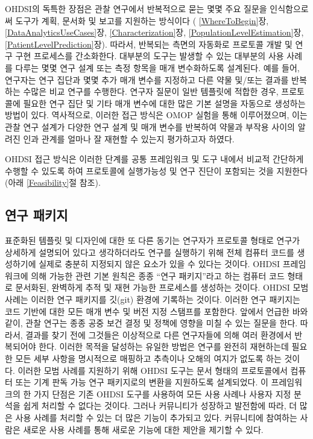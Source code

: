 \documentclass[11pt]{book}
\theoremstyle{definition}
\theoremstyle{definition}
\theoremstyle{definition}
\theoremstyle{remark}
\begin{document}
OHDSI의 독특한 장점은 관찰 연구에서 반복적으로 묻는 몇몇 주요 질문을
인식함으로써 도구가 계획, 문서화 및 보고를 지원하는 방식이다 (
\ref{WhereToBegin}장, \ref{DataAnalyticsUseCases}장,
\ref{Characterization}장, \ref{PopulationLevelEstimation}장,
\ref{PatientLevelPrediction}장). 따라서, 반복되는 측면의 자동화로
프로토콜 개발 및 연구 구현 프로세스를 간소화한다. 대부분의 도구는 발생할
수 있는 대부분의 사용 사례를 다루는 몇몇 연구 설계 또는 측정 항목을 매개
변수화하도록 설계된다. 예를 들어, 연구자는 연구 집단과 몇몇 추가 매개
변수를 지정하고 다른 약물 및/또는 결과를 반복하는 수많은 비교 연구를
수행한다. 연구자 질문이 일반 템플릿에 적합한 경우, 프로토콜에 필요한
연구 집단 및 기타 매개 변수에 대한 많은 기본 설명을 자동으로 생성하는
방법이 있다. 역사적으로, 이러한 접근 방식은 OMOP 실험을 통해
이루어졌으며, 이는 관찰 연구 설계가 다양한 연구 설계 및 매개 변수를
반복하여 약물과 부작용 사이의 알려진 인과 관계를 얼마나 잘 재현할 수
있는지 평가하고자 하였다.

OHDSI 접근 방식은 이러한 단계를 공통 프레임워크 및 도구 내에서 비교적
간단하게 수행할 수 있도록 하여 프로토콜에 실행가능성 및 연구 진단이
포함되는 것을 지원한다 (아래 \ref{Feasibility}절 참조).

\subsection{연구 패키지}\label{-}


표준화된 템플릿 및 디자인에 대한 또 다른 동기는 연구자가 프로토콜 형태로
연구가 상세하게 설명되어 있다고 생각하더라도 연구를 실행하기 위해 전체
컴퓨터 코드를 생성하기에 실제로 충분히 지정되지 않은 요소가 있을 수
있다는 것이다. OHDSI 프레임워크에 의해 가능한 관련 기본 원칙은 종종
``연구 패키지''라고 하는 컴퓨터 코드 형태로 문서화된, 완벽하게 추적 및
재현 가능한 프로세스를 생성하는 것이다. OHDSI 모범 사례는 이러한 연구
패키지를 깃(git) 환경에 기록하는 것이다. 이러한 연구 패키지는 코드
기반에 대한 모든 매개 변수 및 버전 지정 스탬프를 포함한다. 앞에서 언급한
바와 같이, 관찰 연구는 종종 공중 보건 결정 및 정책에 영향을 미칠 수 있는
질문을 한다. 따라서, 결과를 찾기 전에 그것들은 이상적으로 다른
연구자들에 의해 여러 환경에서 반복되어야 한다. 이러한 목적을 달성하는
유일한 방법은 연구를 완전히 재현하는데 필요한 모든 세부 사항을
명시적으로 매핑하고 추측이나 오해의 여지가 없도록 하는 것이다. 이러한
모범 사례를 지원하기 위해 OHDSI 도구는 문서 형태의 프로토콜에서 컴퓨터
또는 기계 판독 가능 연구 패키지로의 변환을 지원하도록 설계되었다. 이
프레임워크의 한 가지 단점은 기존 OHDSI 도구를 사용하여 모든 사용 사례나
사용자 지정 분석을 쉽게 처리할 수 없다는 것이다. 그러나 커뮤니티가
성장하고 발전함에 따라, 더 많은 사용 사례를 처리할 수 있는 더 많은
기능이 추가되고 있다. 커뮤니티에 참여하는 사람은 새로운 사용 사례를 통해
새로운 기능에 대한 제안을 제기할 수 있다.
\end{document}

